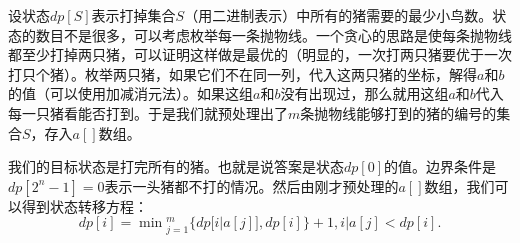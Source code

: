 设状态$dp[S]$表示打掉集合$S$（用二进制表示）中所有的猪需要的最少小鸟数。状态的数目不是很多，可以考虑枚举每一条抛物线。一个贪心的思路是使每条抛物线都至少打掉两只猪，可以证明这样做是最优的（明显的，一次打两只猪要优于一次打只个猪）。枚举两只猪，如果它们不在同一列，代入这两只猪的坐标，解得$a$和$b$的值（可以使用加减消元法）。如果这组$a$和$b$没有出现过，那么就用这组$a$和$b$代入每一只猪看能否打到。于是我们就预处理出了$m$条抛物线能够打到的猪的编号的集合$S$，存入$a[]$数组。

我们的目标状态是打完所有的猪。也就是说答案是状态$dp[0]$的值。边界条件是$dp[2^n-1]=0$表示一头猪都不打的情况。然后由刚才预处理的$a[]$数组，我们可以得到状态转移方程：
\begin{equation*}
dp[i]=\min\!^m_{j=1}\{dp[i|a[j]],dp[i]\}+1, i|a[j]<dp[i].
\end{equation*}

